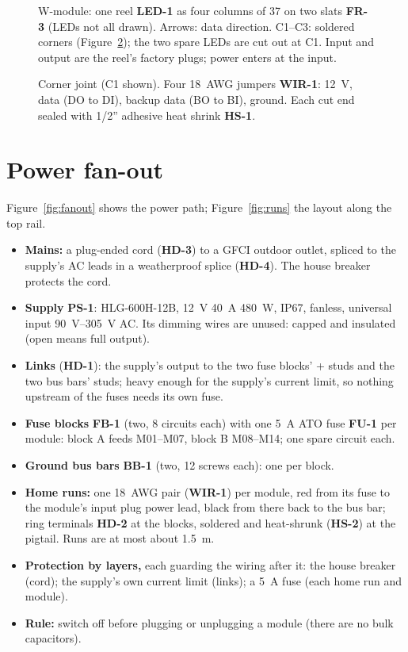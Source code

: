 \documentclass[11pt,letterpaper]{article}
\newcommand{\id}[1]{\textsf{\textbf{#1}}}  %
\begin{document}
\begin{figure}[!htbp]
  \centering
  
  \caption{W-module: one reel \id{LED-1} as four columns of 37 on two slats \id{FR-3} (LEDs not all drawn).
    Arrows: data direction.  C1--C3: soldered corners (Figure~\ref{fig:corner}); the two spare LEDs are cut out
    at C1.  Input and output are the reel's factory plugs; power enters at the input.}
  \label{fig:w-module}
\end{figure}

\begin{figure}[!htbp]
  \centering
  
  \caption{Corner joint (C1 shown).  Four 18~AWG jumpers \id{WIR-1}: \SI{12}{V}, data (DO to DI), backup data
    (BO to BI), ground.  Each cut end sealed with 1/2'' adhesive heat shrink \id{HS-1}.}
  \label{fig:corner}
\end{figure}

\section{Power fan-out}

Figure~\ref{fig:fanout} shows the power path; Figure~\ref{fig:runs} the layout along the top rail.
\begin{itemize}
  \item \textbf{Mains:} a plug-ended cord (\id{HD-3}) to a GFCI outdoor outlet, spliced to the supply's AC leads
    in a weatherproof splice (\id{HD-4}).  The house breaker protects the cord.
  \item \textbf{Supply} \id{PS-1}: HLG-600H-12B, \SI{12}{V} \SI{40}{A} \SI{480}{W}, IP67, fanless, universal input
    \SIrange{90}{305}{V} AC.  Its dimming wires are unused: capped and insulated (open means full output).
  \item \textbf{Links} (\id{HD-1}): the supply's output to the two fuse blocks' + studs and the two bus bars'
    studs; heavy enough for the supply's current limit, so nothing upstream of the fuses needs its own fuse.
  \item \textbf{Fuse blocks} \id{FB-1} (two, 8 circuits each) with one \SI{5}{A} ATO fuse \id{FU-1} per module:
    block A feeds M01--M07, block B M08--M14; one spare circuit each.
  \item \textbf{Ground bus bars} \id{BB-1} (two, 12 screws each): one per block.
  \item \textbf{Home runs:} one 18~AWG pair (\id{WIR-1}) per module, red from its fuse to the module's input plug
    power lead, black from there back to the bus bar; ring terminals \id{HD-2} at the blocks, soldered and
    heat-shrunk (\id{HS-2}) at the pigtail.  Runs are at most about \SI{1.5}{m}.
  \item \textbf{Protection by layers,} each guarding the wiring after it: the house breaker (cord); the supply's
    own current limit (links); a \SI{5}{A} fuse (each home run and module).
  \item \textbf{Rule:} switch off before plugging or unplugging a module (there are no bulk capacitors).
\end{itemize}
\end{document}
